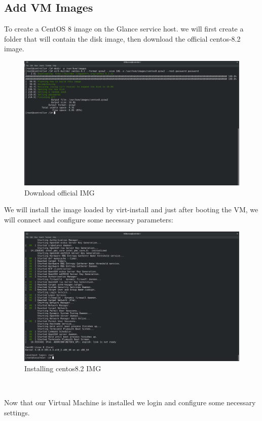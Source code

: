 \begin{spacing}{1.2}
\section{Add VM Images}

\par To create a CentOS 8 image on the Glance service host. we will first create a folder that will contain the disk image, then download the official centos-8.2 image.


\begin{figure}[!htb] 
\begin{center} 
\includegraphics[width=0.93\linewidth]{Cloud/Add Virtual Machine Images/Add VM Images/Download official IMG} 
\end{center} 
\caption{Download official IMG} 
\end{figure}  \FloatBarrier

\par We will install the image loaded by virt-install and just after booting the VM, we will connect and configure some necessary parameters: 


\begin{figure}[!htb] 
\begin{center} 
\includegraphics[width=0.93\linewidth]{Cloud/Add Virtual Machine Images/Add VM Images/Installing centos8.2 IMG} 
\end{center} 
\caption{Installing centos8.2 IMG} 
\end{figure}  \FloatBarrier
\\
\par Now that our Virtual Machine is installed we login and configure some necessary settings.


\end{spacing}

